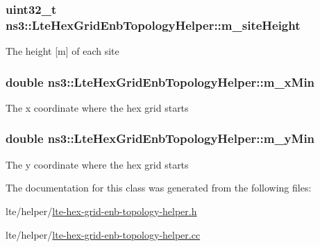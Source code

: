 \subsubsection[{\texorpdfstring{m\+\_\+site\+Height}{m_siteHeight}}]{\setlength{\rightskip}{0pt plus 5cm}uint32\+\_\+t ns3\+::\+Lte\+Hex\+Grid\+Enb\+Topology\+Helper\+::m\+\_\+site\+Height\hspace{0.3cm}{\ttfamily [private]}}\hypertarget{classns3_1_1LteHexGridEnbTopologyHelper_af38a5c65a2918c9019697aba8fef42d5}{}\label{classns3_1_1LteHexGridEnbTopologyHelper_af38a5c65a2918c9019697aba8fef42d5}
The height \mbox{[}m\mbox{]} of each site 
\subsubsection[{\texorpdfstring{m\+\_\+x\+Min}{m_xMin}}]{\setlength{\rightskip}{0pt plus 5cm}double ns3\+::\+Lte\+Hex\+Grid\+Enb\+Topology\+Helper\+::m\+\_\+x\+Min\hspace{0.3cm}{\ttfamily [private]}}\hypertarget{classns3_1_1LteHexGridEnbTopologyHelper_a5486ea38b22f6e0c9c9fb7125aea6321}{}\label{classns3_1_1LteHexGridEnbTopologyHelper_a5486ea38b22f6e0c9c9fb7125aea6321}
The x coordinate where the hex grid starts 
\subsubsection[{\texorpdfstring{m\+\_\+y\+Min}{m_yMin}}]{\setlength{\rightskip}{0pt plus 5cm}double ns3\+::\+Lte\+Hex\+Grid\+Enb\+Topology\+Helper\+::m\+\_\+y\+Min\hspace{0.3cm}{\ttfamily [private]}}\hypertarget{classns3_1_1LteHexGridEnbTopologyHelper_a87668f1e7197c17dee55fd90c9c94f7d}{}\label{classns3_1_1LteHexGridEnbTopologyHelper_a87668f1e7197c17dee55fd90c9c94f7d}
The y coordinate where the hex grid starts 

The documentation for this class was generated from the following files\+:\begin{DoxyCompactItemize}
\item 
lte/helper/\hyperlink{lte-hex-grid-enb-topology-helper_8h}{lte-\/hex-\/grid-\/enb-\/topology-\/helper.\+h}\item 
lte/helper/\hyperlink{lte-hex-grid-enb-topology-helper_8cc}{lte-\/hex-\/grid-\/enb-\/topology-\/helper.\+cc}\end{DoxyCompactItemize}
